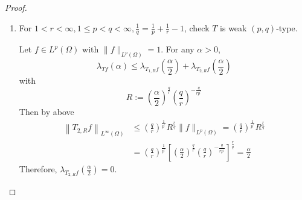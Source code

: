 \begin{proof}
\begin{enumerate}[label=(\Roman*)]
		\item For $1<r<\infty, 1 \leq p<q<\infty, \frac{1}{q}=\frac{1}{p}+\frac{1}{r}-1$, check $T$ is weak $(p,q)$-type.

		\noindent Let $f \in L^p(\Omega)$ with $\|f\|_{L^p(\Omega)}=1$. For any $\alpha > 0$,
		\begin{equation*}
			\lambda_{T f}(\alpha) \leq \lambda_{T_{1, R} f}\left(\frac{\alpha}{2}\right)+\lambda_{T_{2, R} f}\left(\frac{\alpha}{2}\right)
		\end{equation*}
		with
		\begin{equation*}
			R:=\left(\frac{\alpha}{2}\right)^{\frac{q}{r}}\left(\frac{q}{r}\right)^{-\frac{q}{r p^{\prime}}}
		\end{equation*}
		Then by above
		\begin{equation*}
			\begin{aligned}
				\left\|T_{2, R} f\right\|_{L^{\infty}(\Omega)} & \leq\left(\frac{q}{r}\right)^{\frac{1}{p^{\prime}}} R^{\frac{r}{q}}\|f\|_{L^p(\Omega)}=\left(\frac{q}{r}\right)^{\frac{1}{p^{\prime}}} R^{\frac{r}{q}} \\
				& =\left(\frac{q}{r}\right)^{\frac{1}{p^{\prime}}}\left[\left(\frac{\alpha}{2}\right)^{\frac{q}{r}}\left(\frac{q}{r}\right)^{-\frac{q}{r p^{\prime}}}\right]^{\frac{r}{q}}=\frac{\alpha}{2}
			\end{aligned}
		\end{equation*}
		Therefore, $\lambda_{T_{2, R} f}\left(\frac{\alpha}{2}\right)=0$.


\end{enumerate}
\end{proof}

